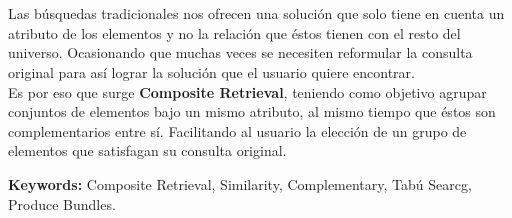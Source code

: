\chapter*{\runtitle}

\noindent Las búsquedas tradicionales nos ofrecen una solución que solo tiene en cuenta un atributo de los elementos y no la relación que éstos tienen con el resto del universo. Ocasionando que muchas veces se necesiten reformular la consulta original para así lograr la solución que el usuario quiere encontrar.\\
Es por eso que surge \textbf{Composite Retrieval}, teniendo como objetivo agrupar conjuntos de elementos bajo un mismo atributo, al mismo tiempo que éstos son complementarios entre sí. Facilitando al usuario la elección de un grupo de elementos que satisfagan su consulta original.

\bigskip

\noindent\textbf{Keywords:} Composite Retrieval, Similarity, Complementary, Tabú Searcg, Produce Bundles.